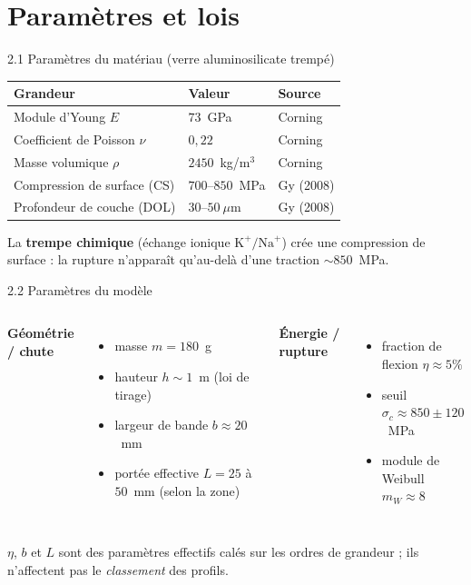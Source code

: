 \documentclass[11pt,aspectratio=169]{beamer}
\begin{document}
\section{Paramètres et lois}
\begin{frame}{2.1 Paramètres du matériau (verre aluminosilicate trempé)}
  \centering\small
  \begin{tabular}{lll}
  \toprule
  Grandeur & Valeur & Source \\
  \midrule
  Module d'Young $E$ & $73$~GPa & Corning \\
  Coefficient de Poisson $\nu$ & $0{,}22$ & Corning \\
  Masse volumique $\rho$ & $2450$~kg/m$^3$ & Corning \\
  Compression de surface (CS) & $700$--$850$~MPa & Gy (2008) \\
  Profondeur de couche (DOL) & $30$--$50~\mu$m & Gy (2008) \\
  \bottomrule
  \end{tabular}
  \vspace{0.4cm}
  \par\footnotesize La \textbf{trempe chimique} (échange ionique
  $\mathrm{K}^{+}/\mathrm{Na}^{+}$) crée une compression de surface : la rupture
  n'apparaît qu'au-delà d'une traction $\sim 850$~MPa.
\end{frame}

\begin{frame}{2.2 Paramètres du modèle}
  \footnotesize
  \begin{columns}[T]
    \textbf{Géométrie / chute}
    \begin{itemize}
      \item masse $m=180$~g
      \item hauteur $h\sim 1$~m (loi de tirage)
      \item largeur de bande $b\approx 20$~mm
      \item portée effective $L=25$ à $50$~mm (selon la zone)
    \end{itemize}
    \textbf{Énergie / rupture}
    \begin{itemize}
      \item fraction de flexion $\eta\approx 5\%$
      \item seuil $\sigma_c\approx 850\pm120$~MPa
      \item module de Weibull $m_W\approx 8$
    \end{itemize}
  \end{columns}
  \vspace{0.3cm}
  \centering\scriptsize\textcolor{danger}{$\eta$, $b$ et $L$ sont des paramètres
  effectifs calés sur les ordres de grandeur ; ils n'affectent pas le
  \emph{classement} des profils.}
\end{frame}
\end{document}
